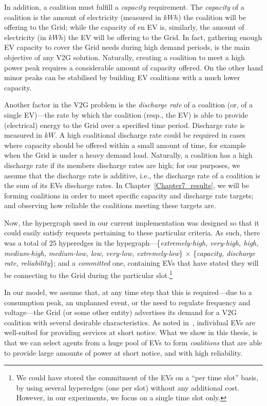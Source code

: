 In addition, a coalition must fulfill a {\em capacity} requirement. 
The {\em capacity} of a coalition is the amount of electricity (measured in $kWh$) the coalition will be offering to the Grid; 
while the capacity of en EV is, similarly, the amount of electricity (in $kWh$) the EV will be offering to the Grid.
In fact, gathering enough EV capacity to cover the Grid needs during high demand periods, is the main objective of any V2G solution. 
Naturally, creating a coalition to meet a high power peak requires a considerable amount of capacity offered. 
On the other hand minor peaks can be stabilised by building EV coalitions with a much lower capacity.

Another factor in the V2G problem is the {\em discharge rate} of a coalition (or, of a single EV)---the rate by which the coalition (resp., the EV) is able to provide (electrical) energy to the Grid over a specified time period. Discharge rate is measured in $kW.$ %
A high coalitional discharge rate could be required in cases where capacity should be offered within a small amount of time, for example when the Grid is under a heavy demand load. 
Naturally, a coalition has a high discharge rate if its members discharge rates are high; for our purposes, we assume that the discharge rate is additive, i.e., the discharge rate of a coalition is the sum of its EVs discharge rates.
In Chapter~\ref{Chapter7_results}, we will be forming coalitions in order to meet specific capacity and discharge rate targets; and observing how reliable the coalitions meeting these targets are.

Now, the hypergraph used in our current implementation was designed so that it could easily satisfy requests pertaining to these particular criteria.
As such, there was a total of $25$ hyperedges in the hypegraph---\{{\em extremely-high, very-high, high, medium-high, medium-low, low, very-low, extremely-low}\} $\times$ \{{\em capacity, discharge rate, reliability}\}; and a {\em committed} one, containing EVs that have stated they will be connecting to the Grid during the particular slot.\footnote{We could have stored the commitment of the EVs on a ``per time slot'' basis, by using several hyperedges (one per slot) without any additional cost. However, in our experiments, we focus on a single time slot only.}

In our model, we assume that, at any time step that this is required---due to a consumption peak, an unplanned event, or the need to regulate frequency and voltage---the Grid (or some other entity) advertises its demand for a V2G coalition with several desirable characteristics. As noted in~\cite{kamboj2011deploying}, individual EVs are well-suited for providing services at short notice. What we show in this thesis, is that we can select agents from a huge pool of EVs to form {\em coalitions} that are able to provide large amounts of power at short notice, and with high reliability.


